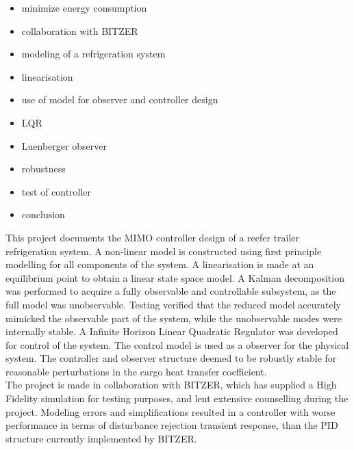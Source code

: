 \abstract
\begin{itemize}
	\item minimize energy consumption
	\item collaboration with BITZER
	\item modeling of a refrigeration system
	\item linearisation
	\item use of model for observer and controller design
	\item LQR
	\item Luenberger observer
	\item robustness
	\item test of controller
	\item conclusion
\end{itemize}

This project documents the MIMO controller design of a reefer trailer refrigeration system. A non-linear model is constructed using first principle modelling for all components of the system. A linearisation is made at an equilibrium point to obtain a linear state space model. A Kalman decomposition was performed to acquire a fully observable and controllable subsystem, as the full model was unobservable. Testing verified that the reduced model accurately mimicked the observable part of the system, while the unobservable modes were internally stable. A Infinite Horizon Linear Quadratic Regulator was developed for control of the system. The control model is used as a observer for the physical system. The controller and observer structure deemed to be robustly stable for reasonable perturbations in the cargo heat transfer coefficient.\\
The project is made in collaboration with BITZER, which has supplied a High Fidelity simulation for testing purposes, and lent extensive counselling during the project. Modeling errors and simplifications resulted in a controller with worse performance in terms of disturbance rejection transient response, than the PID structure currently implemented by BITZER.